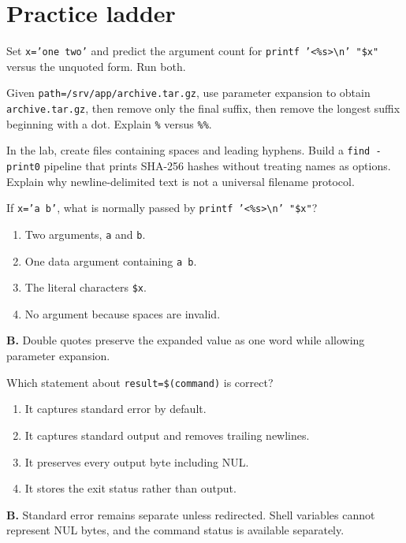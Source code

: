 \documentclass[11pt,oneside,openany]{book}
\newcommand{\fourchoices}[4]{%
  \begin{enumerate}[label=\Alph*),leftmargin=2em,itemsep=0.25em]
    \item #1
    \item #2
    \item #3
    \item #4
  \end{enumerate}}
\begin{document}
\section{Practice ladder}
\begin{practicebox}[title={Easy -- quotation prediction}]
Set \texttt{x='one two'} and predict the argument count for \texttt{printf '<\%s>\textbackslash n' "\$x"} versus the unquoted form. Run both.
\end{practicebox}
\begin{practicebox}[title={Medium -- decompose paths}]
Given \texttt{path=/srv/app/archive.tar.gz}, use parameter expansion to obtain \texttt{archive.tar.gz}, then remove only the final suffix, then remove the longest suffix beginning with a dot. Explain \texttt{\%} versus \texttt{\%\%}.
\end{practicebox}
\begin{practicebox}[title={Hard -- hostile filenames}]
In the lab, create files containing spaces and leading hyphens. Build a \texttt{find -print0} pipeline that prints SHA-256 hashes without treating names as options. Explain why newline-delimited text is not a universal filename protocol.
\end{practicebox}

\begin{questionbox}[title={Medium 3.1 -- Double quotes}]
If \texttt{x='a b'}, what is normally passed by \texttt{printf '<\%s>\textbackslash n' "\$x"}?
\fourchoices{Two arguments, \texttt{a} and \texttt{b}.}{One data argument containing \texttt{a b}.}{The literal characters \texttt{\$x}.}{No argument because spaces are invalid.}
\end{questionbox}
\begin{answerbox}
\textbf{B.} Double quotes preserve the expanded value as one word while allowing parameter expansion.
\end{answerbox}

\begin{questionbox}[title={Hard 3.2 -- Command substitution}]
Which statement about \texttt{result=\$(command)} is correct?
\fourchoices{It captures standard error by default.}{It captures standard output and removes trailing newlines.}{It preserves every output byte including NUL.}{It stores the exit status rather than output.}
\end{questionbox}
\begin{answerbox}
\textbf{B.} Standard error remains separate unless redirected. Shell variables cannot represent NUL bytes, and the command status is available separately.
\end{answerbox}
\end{document}
